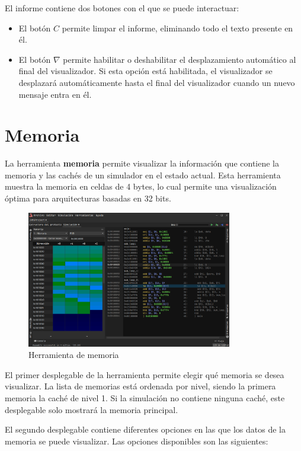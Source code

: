 El informe contiene dos botones con el que se puede interactuar:
\begin{itemize}
    \item El botón $C$ permite limpar el informe, eliminando todo el
    texto presente en él.
    \item El botón $\nabla$ permite habilitar o deshabilitar el desplazamiento
    automático al final del visualizador.
    Si esta opción está habilitada, el visualizador se desplazará
    automáticamente hasta el final del visualizador cuando un
    nuevo mensaje entra en él.
\end{itemize}


\section{Memoria}\label{sec:memoria-herramienta}

La herramienta \textbf{memoria} permite visualizar la información que
contiene la memoria y las cachés de un simulador en el estado actual.
Esta herramienta muestra la memoria en celdas de 4 bytes,
lo cual permite una visualización óptima para arquitecturas
basadas en 32 bits.

\begin{figure}[H]
    \centering
    \includegraphics[width=0.8\textwidth]{images/tools/jams-memory}
    \caption{Herramienta de memoria}
    \label{fig:jams-memory}
\end{figure}

El primer desplegable de la herramienta permite elegir qué
memoria se desea visualizar.
La lista de memorias está ordenada por nivel, siendo la primera
memoria la caché de nivel 1.
Si la simulación no contiene ninguna caché,
este desplegable solo mostrará la memoria principal.

El segundo desplegable contiene diferentes opciones
en las que los datos de la memoria se puede visualizar.
Las opciones disponibles son las siguientes:

